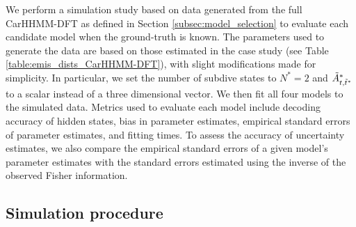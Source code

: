
We perform a simulation study based on data generated from the full CarHHMM-DFT as defined in Section \ref{subsec:model_selection} to evaluate each candidate model when the ground-truth is known. The parameters used to generate the data are based on those estimated in the case study (see Table \ref{table:emis_dists_CarHHMM-DFT}), with slight modifications made for simplicity. In particular, we set the number of subdive states to $N^*=2$ and $\tilde{A}^*_{t,\tilde t^*}$ to a scalar instead of a three dimensional vector. We then fit all four models to the simulated data. Metrics used to evaluate each model include decoding accuracy of hidden states, bias in parameter estimates, empirical standard errors of parameter estimates, and fitting times. To assess the accuracy of uncertainty estimates, we also compare the empirical standard errors of a given model's parameter estimates with the standard errors estimated using the inverse of the observed Fisher information.

\subsection{Simulation procedure}
\label{subsec:data_simulation}

